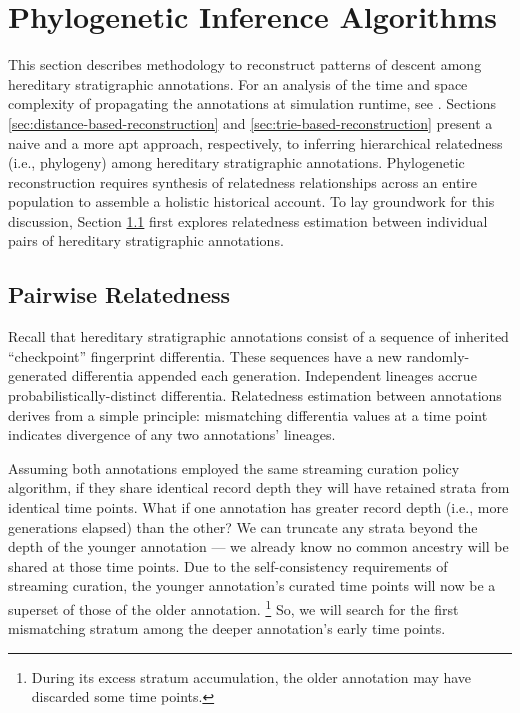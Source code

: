 \section{Phylogenetic Inference Algorithms} \label{sec:reconstruction-algorithm}

This section describes methodology to reconstruct patterns of descent among hereditary stratigraphic annotations.  %
For an analysis of the time and space complexity of propagating the annotations at simulation runtime, see \citep{OTHERPREPRINT}. %
Sections \ref{sec:distance-based-reconstruction} and \ref{sec:trie-based-reconstruction} present a naive and a more apt approach, respectively, to inferring hierarchical relatedness (i.e., phylogeny) among hereditary stratigraphic annotations.
Phylogenetic reconstruction requires synthesis of relatedness relationships across an entire population to assemble a holistic historical account.  %
To lay groundwork for this discussion, Section \ref{sec:pairwise-relatedness} first explores relatedness estimation between individual pairs of hereditary stratigraphic annotations.

\subsection{Pairwise Relatedness}
\label{sec:pairwise-relatedness}
Recall that hereditary stratigraphic annotations consist of a sequence of inherited ``checkpoint'' fingerprint differentia.
These sequences have a new randomly-generated differentia appended each generation.
Independent lineages accrue probabilistically-distinct differentia.
Relatedness estimation between annotations derives from a simple principle: mismatching differentia values at a time point indicates divergence of any two annotations' lineages.

Assuming both annotations employed the same streaming curation policy algorithm, if they share identical record depth they will have retained strata from identical time points.
What if one annotation has greater record depth (i.e., more generations elapsed) than the other?
We can truncate any strata beyond the depth of the younger annotation --- we already know no common ancestry will be shared at those time points.
Due to the self-consistency requirements of streaming curation, the younger annotation's curated time points will now be a superset of those of the older annotation.%
\footnote{During its excess stratum accumulation, the older annotation may have discarded some time points.}
So, we will search for the first mismatching stratum among the deeper annotation's early time points.

